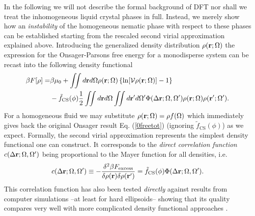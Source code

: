 \documentclass[amssymb]{revtex4}
\newcommand{\bfr}{{\bf r}}
\begin{document}
In the following we will not describe the formal background of DFT  nor shall we treat 
the inhomogeneous liquid crystal 
phases in full. Instead, we merely show how an {\em instability} of the homogeneous nematic 
phase with respect to these phases can be established starting
from the rescaled second virial approximation explained above.
Introducing the generalized density distribution $\rho(\bfr;\Omega)$ the expression for the Onsager-Parsons free energy 
for a monodisperse system can be recast into the following density functional
\begin{align}
\beta F[\rho] =& \beta \mu_{0} +\iint d\bfr d\Omega \rho(\bfr;\Omega) \left\{ \ln [\mathcal{V}\rho(\bfr;\Omega)]-1\right\} \nonumber \\
&-\tilde{f}_{\text{CS}}(\phi)\frac{1}{2}\iint d\bfr d\Omega \iint d\bfr^{\prime} d\Omega^{\prime} \Phi(\Delta \bfr; \Omega, \Omega^{\prime})\rho(\bfr;\Omega)
\rho(\bfr^{\prime};\Omega^{\prime}).
\label{0freeDFT}
\end{align}
For a homogeneous fluid we may substitute $\rho(\bfr;\Omega)=\rho f(\Omega)$
which immediately gives back the original Onsager result Eq. (\ref{0freetot})
(ignoring $\tilde{f}_{\text{CS}}(\phi)$) as we expect.
Formally, the second virial approximation represents the simplest density functional one can construct.
It corresponds  to the {\em direct correlation function} $c(\Delta \bfr;\Omega,\Omega^{\prime})$ \cite{hansenmacdonald} being proportional to 
the Mayer function for all densities, i.e.
\begin{equation}
c(\Delta\bfr;\Omega,\Omega^{\prime}) \equiv -\frac{\delta^{2}\beta F_{\text{excess}}}{\delta \rho (\bfr)
\delta \rho(\bfr^{\prime})} = \tilde{f}_{\text{CS}}(\phi)\Phi(\Delta \bfr;\Omega,\Omega^{\prime}).
\label{0correl}
\end{equation}
This correlation function  has also been tested {\em directly} against results from computer simulations --at least for hard ellipsoids-- showing that its quality  compares
very well with more complicated density functional approaches \cite{allenstructurefactor}.
\end{document}
